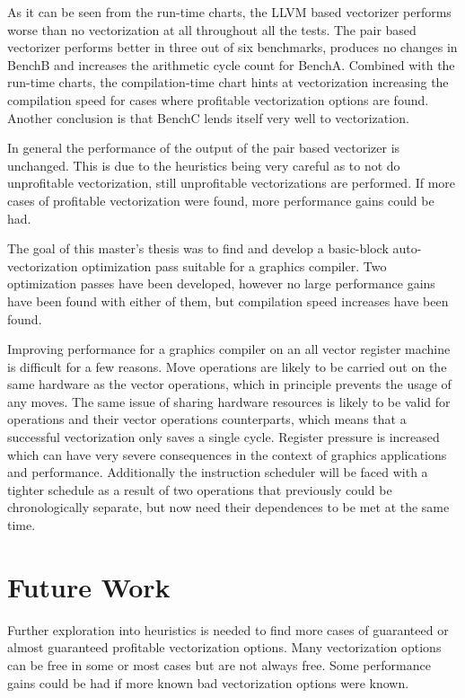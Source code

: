 \documentclass[12pt,a4paper,onecolumn,twoside,openright]{report}
\begin{document}
As it can be seen from the run-time charts, the LLVM based vectorizer performs worse than no vectorization at all throughout all the tests. The pair based vectorizer performs better in three out of six benchmarks, produces no changes in BenchB and increases the arithmetic cycle count for BenchA.
Combined with the run-time charts, the compilation-time chart hints at vectorization increasing the compilation speed for cases where profitable vectorization options are found.
Another conclusion is that BenchC lends itself very well to vectorization.

In general the performance of the output of the pair based vectorizer is unchanged. This is due to the heuristics being very careful as to not do unprofitable vectorization, still unprofitable vectorizations are performed. If more cases of profitable vectorization were found, more performance gains could be had.

The goal of this master's thesis was to find and develop a basic-block auto-vectorization optimization pass suitable for a graphics compiler. Two optimization passes have been developed, however no large performance gains have been found with either of them, but compilation speed increases have been found.

Improving performance for a graphics compiler on an all vector register machine is difficult for a few reasons. Move operations are likely to be carried out on the same hardware as the vector operations, which in principle prevents the usage of any moves. The same issue of sharing hardware resources is likely to be valid for operations and their vector operations counterparts, which means that a successful vectorization only saves a single cycle. Register pressure is increased which can have very severe consequences in the context of graphics applications and performance. Additionally the instruction scheduler will be faced with a tighter schedule as a result of two operations that previously could be chronologically separate, but now need their dependences to be met at the same time.

\section{Future Work}

Further exploration into heuristics is needed to find more cases of guaranteed or almost guaranteed profitable vectorization options. Many vectorization options can be free in some or most cases but are not always free. Some performance gains could be had if more known bad vectorization options were known.
\end{document}
